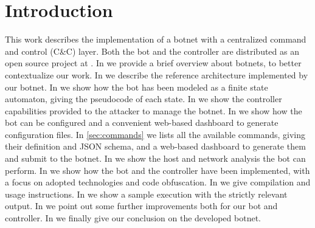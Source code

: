 \section{Introduction}
\label{sec:introduction}

This work describes the implementation of a botnet with a centralized command and control (C\&C) layer. Both the bot and the controller are distributed as an open source project at \cite{project-repo}.
In  we provide a brief overview about botnets, to better contextualize our work.
In  we describe the reference architecture implemented by our botnet.
In  we show how the bot has been modeled as a finite state automaton, giving the pseudocode of each state.
In  we show the controller capabilities provided to the attacker to manage the botnet.
In  we show how the bot can be configured and a convenient web-based dashboard to generate configuration files.
In \ref{sec:commands} we lists all the available commands, giving their definition and JSON schema, and a web-based dashboard to generate them and submit to the botnet.
In  we show the host and network analysis the bot can perform.
In  we show how the bot and the controller have been implemented, with a focus on adopted technologies and code obfuscation.
In  we give compilation and usage instructions.
In  we show a sample execution with the strictly relevant output.
In  we point out some further improvements both for our bot and controller.
In  we finally give our conclusion on the developed botnet.
